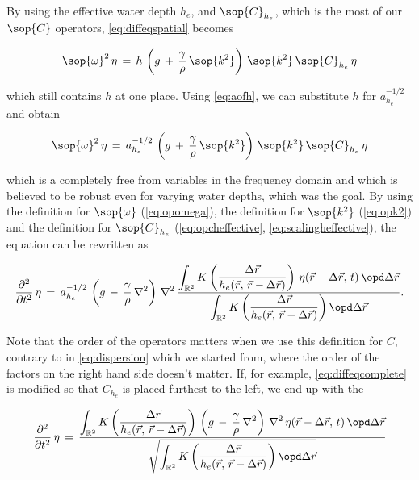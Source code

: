 By using the effective water depth $h_e$, and $\sop{C}_{h_e}$, which is the most  of our $\sop{C}$ operators, \eqref{eq:diffeqspatial} becomes

\begin{equation} \label{eq:diffeqonehstillunknown}
\sop{\omega}^2\,\eta \,=\, h\,\left(g\,+\,\frac{\gamma}{\rho}\,\sop{k^2}\right)\,\sop{k^2}\,\sop{C}_{h_e}\,\eta
\end{equation}

which still contains $h$ at one place. Using \eqref{eq:aofh}, we can substitute $h$ for $a_{h_e}^{-1/2}$ and obtain

\begin{equation} \label{eq:diffeqcomplete}
\sop{\omega}^2\,\eta \,=\, a_{h_e}^{-1/2}\,\left(g\,+\,\frac{\gamma}{\rho}\,\sop{k^2}\right)\,\sop{k^2}\,\sop{C}_{h_e}\,\eta
\end{equation}

which is a \PDE completely free from variables in the frequency domain and which is believed to be robust even for varying water depths, which was the goal. By using the definition for $\sop{\omega}$ (\eqref{eq:opomega}), the definition for $\sop{k^2}$ (\eqref{eq:opk2}) and the definition for $\sop{C}_{h_e}$ (\eqref{eq:opcheffective}, \eqref{eq:scalingheffective}), the equation can be rewritten as

\begin{equation} \label{eq:diffeqnouserdefinedoperators}
\frac{\partial^2}{\partial t^2}\,\eta \,=\, a_{h_e}^{-1/2}\,\left(g\,-\,\frac{\gamma}{\rho}\,\nabla^2\right)\,\nabla^2\,\frac{\displaystyle\int_{\mathbb{R}^2}K\left(\frac{\Delta\vec{r}}{h_e(\vec{r},\,\vec{r}-\Delta\vec{r})}\right)\,\eta(\vec{r}-\Delta\vec{r},\,t)\,\opd\Delta\vec{r}}{\displaystyle\int_{\mathbb{R}^2}K\left(\frac{\Delta\vec{r}}{h_e(\vec{r},\,\vec{r}-\Delta\vec{r})}\right) \opd\Delta\vec{r}}.
\end{equation}

Note that the order of the operators matters when we use this definition for $C$, contrary to in \eqref{eq:dispersion} which we started from, where the order of the factors on the right hand side doesn't matter. If, for example, \eqref{eq:diffeqcomplete} is modified so that $C_{h_e}$ is placed furthest to the left, we end up with the \PDE

\begin{equation} \label{eq:diffeqnouserdefinedoperatorsvariant}
\frac{\partial^2}{\partial t^2}\,\eta \,=\, \frac{\displaystyle\int_{\mathbb{R}^2}K\left(\frac{\Delta\vec{r}}{h_e(\vec{r},\,\vec{r}-\Delta\vec{r})}\right)\,\left(g\,-\,\frac{\gamma}{\rho}\,\nabla^2\right)\,\nabla^2\,\eta(\vec{r}-\Delta\vec{r},\,t)\,\opd\Delta\vec{r}}{\sqrt{\displaystyle\int_{\mathbb{R}^2}K\left(\frac{\Delta\vec{r}}{h_e(\vec{r},\,\vec{r}-\Delta\vec{r})}\right) \opd\Delta\vec{r}}}
\end{equation}

